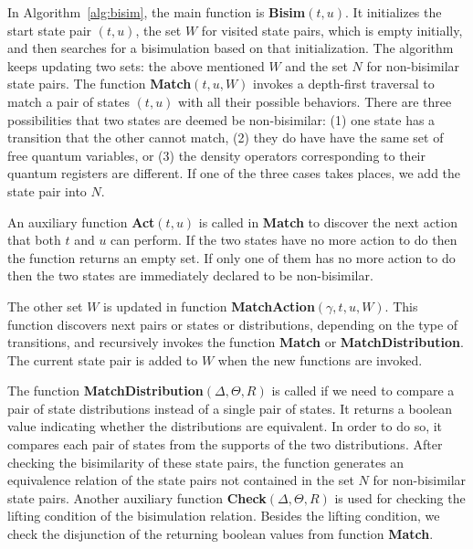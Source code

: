 \documentclass[a4paper,UKenglish,cleveref, autoref]{lipics-v2019}
\begin{document}
In Algorithm~\ref{alg:bisim}, the main function is \textbf{Bisim}$(t,u)$. It initializes the start state pair $(t,u)$, the set $W$ for visited state pairs,  which is empty initially, and then searches for a bisimulation based on that initialization. 
The algorithm keeps updating two sets: the above mentioned $W$  and the set $N$ for non-bisimilar state pairs. The function \textbf{Match}$(t,u,W)$ invokes a depth-first traversal to match a pair of 
states $(t,u)$ with all their possible behaviors. There are three possibilities that two states are deemed be non-bisimilar:  (1) one state has a transition that the other cannot match, (2) they do have have the same set of free quantum variables, or (3) the density operators corresponding to their quantum registers are different. If one of the three cases takes places, we add the state pair into $N$. 

An auxiliary function \textbf{Act}$(t,u)$ is called in \textbf{Match} to discover the next action that both $t$ and $u$ can perform. If the two states have no more action to do then the function returns an empty set. If only one of them has no more action to do then the two states are immediately declared to be non-bisimilar. 

The other set $W$ is updated in function \textbf{MatchAction}$(\gamma,t,u,W)$. This function discovers next pairs or states or distributions, depending on the type of transitions,  and recursively invokes the function \textbf{Match} or \textbf{MatchDistribution}. The current state pair is added to $W$ when the new functions are invoked.

The function \textbf{MatchDistribution}$(\Delta,\Theta,\textit{R})$ is called if we need to compare a pair of state distributions instead of a single pair of states. It returns a boolean value indicating whether the distributions are equivalent. In order to do so, it compares each pair of states from the supports of the two distributions. After checking the bisimilarity of these state pairs, the function generates an equivalence relation of the state pairs not contained in the set $N$ for non-bisimilar state pairs. Another auxiliary function \textbf{Check}$(\Delta,\Theta,\textit{R})$ is used for checking the lifting condition of the bisimulation relation. Besides the lifting condition, we check the disjunction of the returning boolean values from function \textbf{Match}. 
\end{document}
